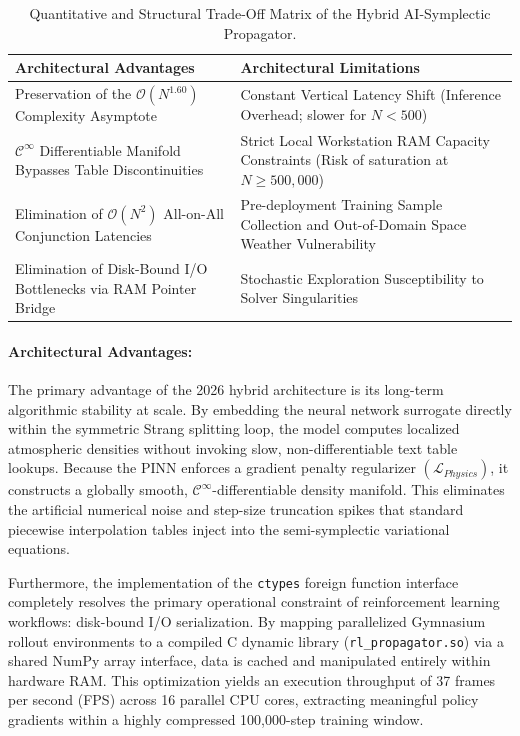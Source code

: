 \documentclass[letterpaper, preprint, 11pt]{AAS}
\begin{document}
\begin{table}[hbt!]
    \centering
    \caption{Quantitative and Structural Trade-Off Matrix of the Hybrid AI-Symplectic Propagator.}
    \label{tab:pros_cons_tradeoffs}
    \begin{tabular}{p{} p{}}
        \toprule
        \textbf{Architectural Advantages} & \textbf{Architectural Limitations} \\
        \midrule
        Preservation of the $\mathcal{O}(N^{1.60})$ Complexity Asymptote & Constant Vertical Latency Shift (Inference Overhead; slower for $N < 500$) \\ \addlinespace
        $\mathcal{C}^\infty$ Differentiable Manifold Bypasses Table Discontinuities & Strict Local Workstation RAM Capacity Constraints (Risk of saturation at $N \ge 500,000$) \\ \addlinespace
        Elimination of $\mathcal{O}(N^2)$ All-on-All Conjunction Latencies & Pre-deployment Training Sample Collection and Out-of-Domain Space Weather Vulnerability \\ \addlinespace
        Elimination of Disk-Bound I/O Bottlenecks via RAM Pointer Bridge & Stochastic Exploration Susceptibility to Solver Singularities \\
        \bottomrule
    \end{tabular}
\end{table}

\paragraph{Architectural Advantages:}
The primary advantage of the 2026 hybrid architecture is its long-term algorithmic stability at scale. By embedding the neural network surrogate directly within the symmetric Strang splitting loop, the model computes localized atmospheric densities without invoking slow, non-differentiable text table lookups. Because the PINN enforces a gradient penalty regularizer $(\mathcal{L}_{Physics})$, it constructs a globally smooth, $\mathcal{C}^\infty$-differentiable density manifold. This eliminates the artificial numerical noise and step-size truncation spikes that standard piecewise interpolation tables inject into the semi-symplectic variational equations. 

Furthermore, the implementation of the \texttt{ctypes} foreign function interface completely resolves the primary operational constraint of reinforcement learning workflows: disk-bound I/O serialization. By mapping parallelized Gymnasium rollout environments to a compiled C dynamic library (\texttt{rl\_propagator.so}) via a shared NumPy array interface, data is cached and manipulated entirely within hardware RAM. This optimization yields an execution throughput of 37 frames per second (FPS) across 16 parallel CPU cores, extracting meaningful policy gradients within a highly compressed 100,000-step training window.
\end{document}
